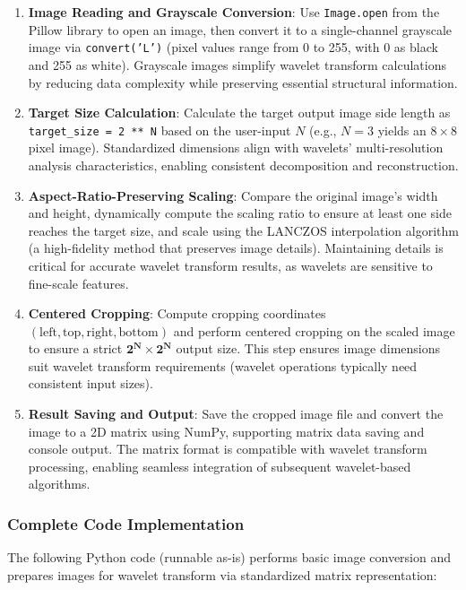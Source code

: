 \documentclass{article}
\theoremstyle{definition} %
\begin{document}
\begin{enumerate}
    \item \textbf{Image Reading and Grayscale Conversion}:
          Use \texttt{Image.open} from the Pillow library to open an image, then convert it to a single-channel grayscale image via \texttt{convert('L')} (pixel values range from 0 to 255, with 0 as black and 255 as white). Grayscale images simplify wavelet transform calculations by reducing data complexity while preserving essential structural information.

    \item \textbf{Target Size Calculation}:
          Calculate the target output image side length as \texttt{target\_size = 2 ** N} based on the user-input \(N\) (e.g., \(N = 3\) yields an \(8 \times 8\) pixel image). Standardized dimensions align with wavelets’ multi-resolution analysis characteristics, enabling consistent decomposition and reconstruction.

    \item \textbf{Aspect-Ratio-Preserving Scaling}:
          Compare the original image’s width and height, dynamically compute the scaling ratio to ensure at least one side reaches the target size, and scale using the LANCZOS interpolation algorithm (a high-fidelity method that preserves image details). Maintaining details is critical for accurate wavelet transform results, as wavelets are sensitive to fine-scale features.

    \item \textbf{Centered Cropping}:
          Compute cropping coordinates \((\text{left}, \text{top}, \text{right}, \text{bottom})\) and perform centered cropping on the scaled image to ensure a strict \(\mathbf{2^N \times 2^N}\) output size. This step ensures image dimensions suit wavelet transform requirements (wavelet operations typically need consistent input sizes).

    \item \textbf{Result Saving and Output}:
          Save the cropped image file and convert the image to a 2D matrix using NumPy, supporting matrix data saving and console output. The matrix format is compatible with wavelet transform processing, enabling seamless integration of subsequent wavelet-based algorithms.
\end{enumerate}

\subsubsection{Complete Code Implementation}
The following Python code (runnable as-is) performs basic image conversion and prepares images for wavelet transform via standardized matrix representation:
\end{document}
